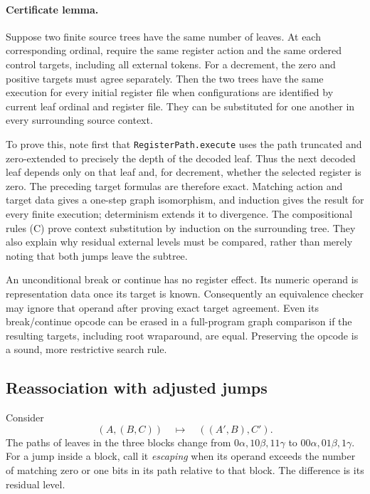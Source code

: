 \paragraph{Certificate lemma.}
Suppose two finite source trees have the same number of leaves.  At each
corresponding ordinal, require the same register action and the same ordered
control targets, including all external tokens.  For a decrement, the zero
and positive targets must agree separately.  Then the two trees have the
same execution for every initial register file when configurations are
identified by current leaf ordinal and register file.  They can be substituted
for one another in every surrounding source context.

To prove this, note first that \texttt{RegisterPath.execute} uses the path
truncated and zero-extended to precisely the depth of the decoded leaf.
Thus the next decoded leaf depends only on that leaf and, for decrement,
whether the selected register is zero.  The preceding target formulas are
therefore exact.  Matching action and target data gives a one-step graph
isomorphism, and induction gives the result for every finite execution;
determinism extends it to divergence.  The compositional rules (C) prove
context substitution by induction on the surrounding tree.  They also
explain why residual external levels must be compared, rather than merely
noting that both jumps leave the subtree.

An unconditional break or continue has no register effect.  Its numeric
operand is representation data once its target is known.  Consequently an
equivalence checker may ignore that operand after proving exact target
agreement.  Even its break/continue opcode can be erased in a full-program
graph comparison if the resulting targets, including root wraparound, are
equal.  Preserving the opcode is a sound, more restrictive search rule.

\subsection*{Reassociation with adjusted jumps}

Consider
\[
             (A,(B,C))\quad\longmapsto\quad((A',B),C').
\tag{L}
\]
The paths of leaves in the three blocks change from
$0\alpha,10\beta,11\gamma$ to $00\alpha,01\beta,1\gamma$.
For a jump inside a block, call it \emph{escaping} when its operand exceeds
the number of matching zero or one bits in its path relative to that block.
The difference is its residual level.

